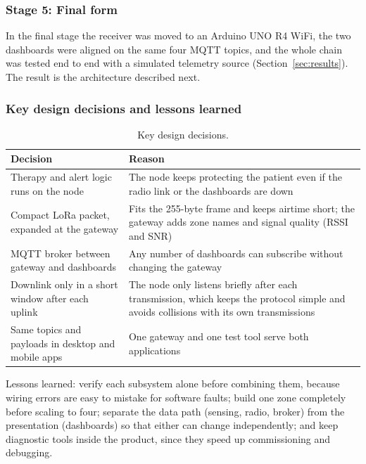 \subsubsection{Stage 5: Final form}
In the final stage the receiver was moved to an Arduino UNO R4 WiFi, the two dashboards were aligned on the same four MQTT topics, and the whole chain was tested end to end with a simulated telemetry source (Section~\ref{sec:results}). The result is the architecture described next.

\subsubsection{Key design decisions and lessons learned}
{\small{}
\begin{table}[H]
\centering
\begin{tabularx}{\textwidth}{@{}>{\raggedright\arraybackslash}p{5.2cm}X@{}}
\toprule
\textbf{Decision} & \textbf{Reason}\\
\midrule
Therapy and alert logic runs on the node & The node keeps protecting the patient even if the radio link or the dashboards are down\\
Compact LoRa packet, expanded at the gateway & Fits the 255-byte frame and keeps airtime short; the gateway adds zone names and signal quality (RSSI and SNR)\\
MQTT broker between gateway and dashboards & Any number of dashboards can subscribe without changing the gateway\\
Downlink only in a short window after each uplink & The node only listens briefly after each transmission, which keeps the protocol simple and avoids collisions with its own transmissions\\
Same topics and payloads in desktop and mobile apps & One gateway and one test tool serve both applications\\
\bottomrule
\end{tabularx}
\caption{Key design decisions.}
\end{table}}
Lessons learned: verify each subsystem alone before combining them, because wiring errors are easy to mistake for software faults; build one zone completely before scaling to four; separate the data path (sensing, radio, broker) from the presentation (dashboards) so that either can change independently; and keep diagnostic tools inside the product, since they speed up commissioning and debugging.

